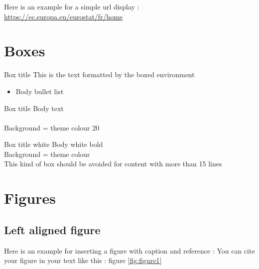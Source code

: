 \documentclass[Theme1]{{template_material/eurostat}}
\begin{document}
Here is an example for a simple url display : \url{https://ec.europa.eu/eurostat/fr/home}

\newpage %


\section{Boxes}

\begin{boxe1}{Box title}
    This is the text formatted by the boxed environment
    \begin{itemize}
        \item Body bullet list
    \end{itemize}
\end{boxe1}

\vspace{1cm}

\begin{boxe2}{Box title}
    Body text \\
     \\
    Background = theme colour 20
\end{boxe2}

\vspace{1cm}

\begin{boxe3}{Box title white}
    Body white bold \\
    Background = theme colour \\
    This kind of box should be avoided for content with more than 15 lines
\end{boxe3}

\newpage %
\section{Figures}

\subsection{Left aligned figure}

Here is an example for inserting a figure with caption and reference :
You can cite your figure in your text like this : figure \ref{fig:figure1}
\end{document}
